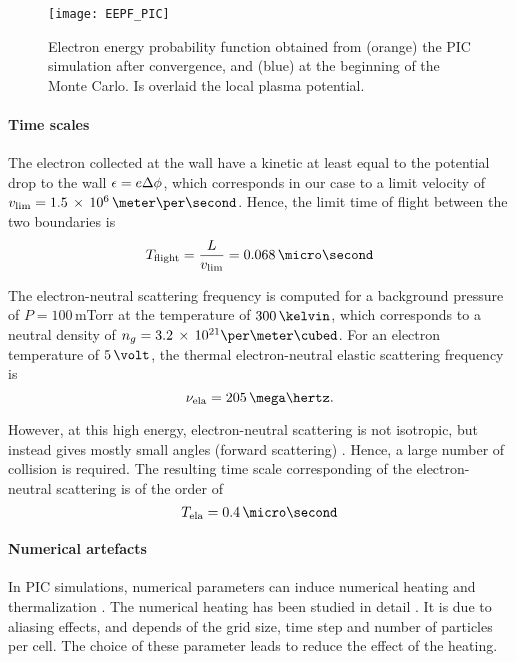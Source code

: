 \begin{figure}[hbtp]
  \centering
  \texttt{[image: EEPF\_PIC]}
  \caption{Electron energy probability function obtained from (orange) the PIC simulation after convergence, and (blue) at the beginning of the Monte Carlo. Is overlaid the local plasma potential.}
  \label{fig-EEPF_start_end}
\end{figure}

\paragraph{Time scales \\}
The electron collected at the wall have a kinetic at least equal to the potential drop to the wall $\epsilon = e \Delta \phi$, which corresponds in our case to a limit velocity of $v_{\rm lim} = \sn{1.5}{6} \,\meter\per\second$.
Hence, the limit time of flight between the two boundaries is
\[ T_{\rm flight} = \frac{L}{v_{\rm lim}} = 0.068 \,\micro\second  \]

\vspace{1em}
The electron-neutral scattering frequency is computed for a background pressure of {$P=100$\,mTorr} at the temperature of $300\,\kelvin$, which corresponds to a neutral density of ${n_g = \sn{3.2}{21} \per\meter\cubed}$.
For an electron temperature of $5\,\volt$, the thermal electron-neutral elastic scattering frequency is 
\[ \nu_{\rm ela} = 205 \,\mega\hertz.  \] 

However, at this high energy, electron-neutral scattering is not isotropic, but instead gives mostly small angles (forward scattering) \citep{vahedi1995}.
Hence, a large number of collision is required.
The resulting time scale corresponding of the electron-neutral scattering is of the order of 
\[ T_{\rm ela} = 0.4 \,\micro\second  \]

\paragraph{Numerical artefacts \\}
In PIC simulations, numerical parameters can induce numerical heating and thermalization \citep{lai2014}.
The numerical heating has been studied in detail \citep{birdsall1991}.
It is due to aliasing effects, and depends of the grid size, time step and number of particles per cell.
The choice of these parameter leads to reduce the effect of the heating.

